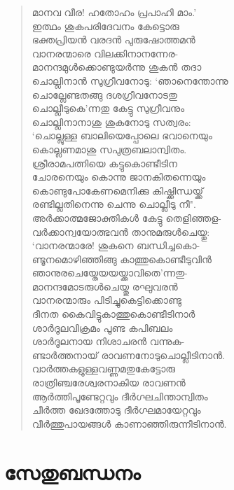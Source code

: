 \begin{verse}
മാനവ വീര! ഹതോഹം പ്രപാഹി മാം.’\\
ഇത്ഥം ശുകപരിദേവനം കേട്ടൊരു\\
ഭക്തപ്രിയന്‍ വരദന്‍ പുരുഷോത്തമന്‍\\
വാനരന്മാരെ വിലക്കിനാനന്നേര-\\
മാനന്ദമുള്‍ക്കൊണ്ടുയര്‍ന്നു ശുകന്‍ തദാ\\
ചൊല്ലിനാന്‍ സുഗ്രീവനോടു: ‘ഞാനെന്തോന്നു\\
ചൊല്ലേണ്ടതങ്ങു ദശഗ്രീവനോടതു\\
ചൊല്ലീടുകെ’ന്നതു കേട്ടു സുഗ്രീവനും\\
ചൊല്ലിനാനാശു ശുകനോടു സത്വരം:\\
‘ചൊല്ലുള്ള ബാലിയെപ്പോലെ ഭവാനെയും\\
കൊല്ലണമാശു സപുത്രബലാന്വിതം.\\
ശ്രീരാമപത്നിയെ കട്ടുകൊണ്ടീടിന\\
ചോരനെയും കൊന്നു ജാനകിതന്നെയും\\
കൊണ്ടുപോകേണമെനിക്കു കിഷ്ക്കിന്ധയ്ക്ക്\\
രണ്ടില്ലതിനെന്നു ചെന്നു ചൊല്ലീടു നീ".\\
അര്‍ക്കാത്മജോക്തികള്‍ കേട്ടു തെളിഞ്ഞള-\\
വര്‍ക്കാന്വയോത്ഭവന്‍ താനുമരുള്‍ചെയ്തു:\\
‘വാനരന്മാരേ! ശുകനെ ബന്ധിച്ചകൊ-\\
ണ്ടൂനമൊഴിഞ്ഞിങ്ങു കാത്തുകൊണ്ടീടുവിന്‍\\
ഞാനുരചെയ്തേയയയ്ക്കാവിതെ’ന്നതു-\\
മാനന്ദമോടരുള്‍ചെയ്തു രഘുവരന്‍\\
വാനരന്മാരും പിടിച്ചുകെട്ടിക്കൊണ്ടു\\
ദീനത കൈവിട്ടുകാത്തുകൊണ്ടീടിനാര്‍\\
ശാര്‍ദൂലവിക്രമം പൂണ്ട കപിബലം\\
ശാര്‍ദൂലനായ നിശാചരന്‍ വന്നുക-\\
ണ്ടാര്‍ത്തനായ് രാവണനോടുചൊല്ലീടിനാന്‍.\\
വാര്‍ത്തകളുള്ളവണ്ണമതുകേട്ടോരു\\
രാത്രിഞ്ചരേശ്വരനാകിയ രാവണന്‍\\
ആര്‍ത്തിപൂണ്ടേറ്റവും ദീര്‍ഗ്ഘചിന്താന്വിതം\\
ചീര്‍ത്ത ഖേദത്തോടു ദീര്‍ഗ്ഘമായേറ്റവും\\
വീര്‍ത്തുപായങ്ങള്‍ കാണാഞ്ഞിരുന്നീടിനാന്‍.
\end{verse}


\section{സേതുബന്ധനം}

